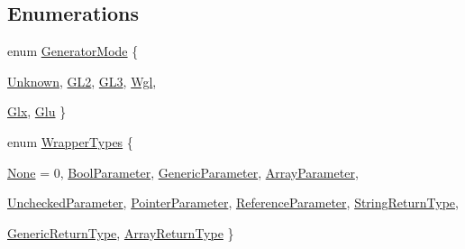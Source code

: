 \subsection*{Enumerations}
\begin{DoxyCompactItemize}
\item 
enum \hyperlink{namespace_bind_a05d10db6d6ebacfb183975fde29f9f34}{GeneratorMode} \{ \par
\hyperlink{namespace_bind_a05d10db6d6ebacfb183975fde29f9f34}{Unknown}, 
\hyperlink{namespace_bind_a05d10db6d6ebacfb183975fde29f9f34}{GL2}, 
\hyperlink{namespace_bind_a05d10db6d6ebacfb183975fde29f9f34}{GL3}, 
\hyperlink{namespace_bind_a05d10db6d6ebacfb183975fde29f9f34}{Wgl}, 
\par
\hyperlink{namespace_bind_a05d10db6d6ebacfb183975fde29f9f34}{Glx}, 
\hyperlink{namespace_bind_a05d10db6d6ebacfb183975fde29f9f34}{Glu}
 \}
\item 
enum \hyperlink{namespace_bind_a84806c2a8584c294f366e3b50609f0bd}{WrapperTypes} \{ \par
\hyperlink{namespace_bind_a84806c2a8584c294f366e3b50609f0bd}{None} =  0, 
\hyperlink{namespace_bind_a84806c2a8584c294f366e3b50609f0bd}{BoolParameter}, 
\hyperlink{namespace_bind_a84806c2a8584c294f366e3b50609f0bd}{GenericParameter}, 
\hyperlink{namespace_bind_a84806c2a8584c294f366e3b50609f0bd}{ArrayParameter}, 
\par
\hyperlink{namespace_bind_a84806c2a8584c294f366e3b50609f0bd}{UncheckedParameter}, 
\hyperlink{namespace_bind_a84806c2a8584c294f366e3b50609f0bd}{PointerParameter}, 
\hyperlink{namespace_bind_a84806c2a8584c294f366e3b50609f0bd}{ReferenceParameter}, 
\hyperlink{namespace_bind_a84806c2a8584c294f366e3b50609f0bd}{StringReturnType}, 
\par
\hyperlink{namespace_bind_a84806c2a8584c294f366e3b50609f0bd}{GenericReturnType}, 
\hyperlink{namespace_bind_a84806c2a8584c294f366e3b50609f0bd}{ArrayReturnType}
 \}
\end{DoxyCompactItemize}


